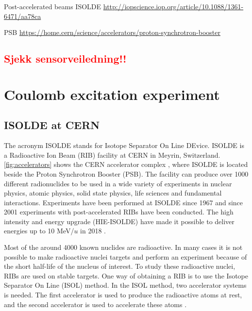 \documentclass[twoside,english]{uiofysmaster/uiofysmaster}
\begin{document}
\bigskip

Post-accelerated beams ISOLDE \url{http://iopscience.iop.org/article/10.1088/1361-6471/aa78ca}

\bigskip

PSB \url{https://home.cern/science/accelerators/proton-synchrotron-booster}


\section*{\textcolor{red}{Sjekk sensorveiledning!!}}


\newpage


\chapter{Coulomb excitation experiment} 


\section{ISOLDE at CERN}
The acronym ISOLDE stands for Isotope Separator On Line DEvice. ISOLDE is a Radioactive Ion Beam (RIB) facility at CERN in Meyrin, Switzerland.  \autoref{fig:accelerators} shows the CERN accelerator complex \cite{CERN-AC}, where ISOLDE is located beside the Proton Synchrotron Booster (PSB). The facility can produce over 1000 different radionuclides to be used in a wide variety of experiments in nuclear physics, atomic physics, solid state physics, life sciences and fundamental interactions. Experiments have been performed at ISOLDE since 1967 and since 2001 experiments with post-accelerated RIBs have been conducted. The high intensity and energy upgrade (HIE-ISOLDE) have made it possible to deliver energies up to 10 MeV/$u$ in 2018 \cite{HIE-ISOLDE, ISOLDE-web, ISOLDE-facility}. 

Most of the around 4000 known nuclides are radioactive. In many cases it is not possible to make radioactive nuclei targets and perform an experiment because of the short half-life of the nucleus of interest. To study these radioactive nuclei, RIBs are used on stable targets. One way of obtaining a RIB is to use the Isotope Separator On Line (ISOL) method. In the ISOL method, two accelerator systems is needed. The first accelerator is used to produce the radioactive atoms at rest, and the second accelerator is used to accelerate these atoms \cite{ISOL}. 
\end{document}
